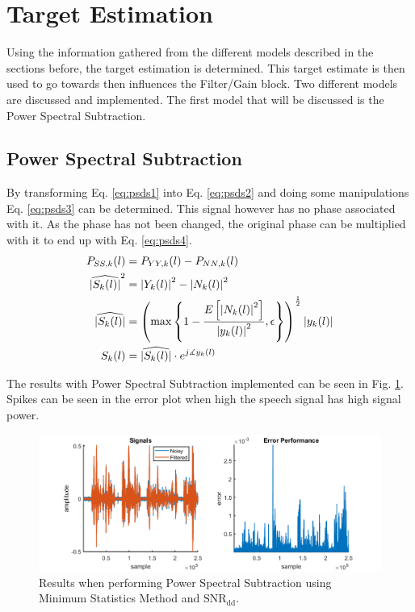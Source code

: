 \section{Target Estimation} \label{sec:target_estimation}
Using the information gathered from the different models described in the sections before, the target estimation is determined. This target estimate is then used to go towards then influences the Filter/Gain block. Two different models are discussed and implemented. The first model that will be discussed is the Power Spectral Subtraction.

\subsection{Power Spectral Subtraction}
By transforming Eq. \ref{eq:psds1} into Eq. \ref{eq:psds2} and doing some manipulations Eq. \ref{eq:psds3} can be determined. This signal however has no phase associated with it. As the phase has not been changed, the original phase can be multiplied with it to end up with Eq. \ref{eq:psds4}.
\begin{align}
  P_{SS,k}(l) &= P_{YY,k}(l) - P_{NN,k}(l)
  \label{eq:psds1} \\
  \widehat{\abs{S_{k}(l)}}^{2} &= \abs{Y_{k}(l)}^{2}-\abs{N_{k}(l)}^{2}
  \label{eq:psds2} \\
  \widehat{\abs{S_{k}(l)}} &=
  \left(\max{\left\{1-\frac{E\left[\abs{N_{k}(l)}^{2}\right]}{\abs{y_{k}(l)}^{2}},\epsilon\right\}}\right)^{\frac{1}{2}}\abs{y_{k}(l)}
  \label{eq:psds3} \\
  S_{k}(l) &= \widehat{\abs{S_{k}(l)}} \cdot e^{j\measuredangle y_{k}(l)}
  \label{eq:psds4}
\end{align}

The results with Power Spectral Subtraction implemented can be seen in Fig. \ref{fig:PSS}. Spikes can be seen in the error plot when high the speech signal has high signal power.

\begin{figure}[h]
	\centering
	\includegraphics[width=\textwidth]{images/spectral_substraction.png}
	\caption{Results when performing Power Spectral Subtraction using Minimum Statistics Method and $\text{SNR}_{\text{dd}}$.}
	\label{fig:PSS}
\end{figure}
\clearpage

